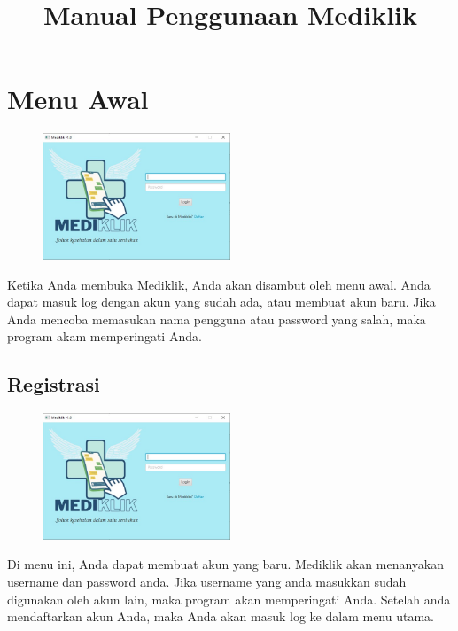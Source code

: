 \documentclass[a4paper]{article}
\title{Manual Penggunaan Mediklik}
\begin{document}
\maketitle
\section{Menu Awal}
\begin{figure}[H]
	\centering
	\includegraphics[width=0.5\textwidth]{imgs/mediklik_1.jpg}
\end{figure}
\par Ketika Anda membuka Mediklik, Anda akan disambut oleh menu awal. Anda dapat masuk log dengan akun yang sudah ada, atau membuat akun baru. Jika Anda mencoba memasukan nama pengguna atau password yang salah, maka program akam memperingati Anda.
\subsection{Registrasi}
\begin{figure}[H]
	\centering
	\includegraphics[width=0.5\textwidth]{imgs/mediklik_2.jpg}
\end{figure}
\par Di menu ini, Anda dapat membuat akun yang baru. Mediklik akan menanyakan username dan password anda. Jika username yang anda masukkan sudah digunakan oleh akun lain, maka program akan memperingati Anda. Setelah anda mendaftarkan akun Anda, maka Anda akan masuk log ke dalam menu utama.
\end{document}
